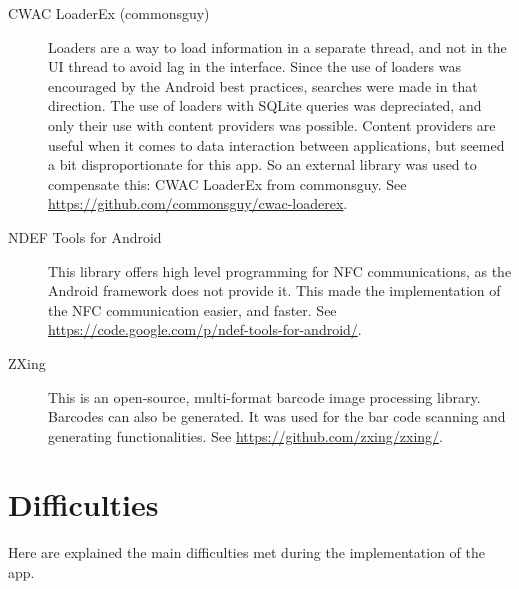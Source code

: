\begin{description}
\item[CWAC LoaderEx (commonsguy)] Loaders are a way to load information in a separate thread, and not in the UI thread to avoid lag in the interface. Since the use of loaders was encouraged by the Android best practices, searches were made in that direction. The use of loaders with SQLite queries was depreciated, and only their use with content providers was possible. Content providers are useful when it comes to data interaction between applications, but seemed a bit disproportionate for this app. So an external library was used to compensate this: CWAC LoaderEx from commonsguy. See \url{https://github.com/commonsguy/cwac-loaderex}.

\item[NDEF Tools for Android] This library offers high level programming for NFC communications, as the Android framework does not provide it. This made the implementation of the NFC communication easier, and faster. See \url{https://code.google.com/p/ndef-tools-for-android/}.

\item[ZXing] This is an open-source, multi-format barcode image processing library. Barcodes can also be generated. It was used for the bar code scanning and generating functionalities. See \url{https://github.com/zxing/zxing/}.
\end{description}



\section{Difficulties}

Here are explained the main difficulties met during the implementation of the app.

